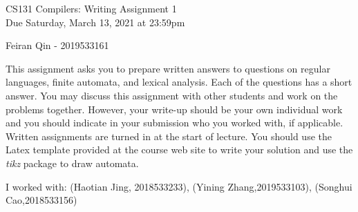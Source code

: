 \documentclass[10pt]{article}
\begin{document}
\begin{center}
\Large CS131 Compilers: Writing Assignment 1\\Due Saturday, March 13, 2021 at 23:59pm
\end{center}

\begin{center}
\LARGE Feiran Qin - 2019533161
\end{center}


This assignment asks you to prepare written answers to questions on
regular languages, finite automata, and lexical analysis.  Each of the
questions has a short answer.  You may discuss this assignment with
other students and work on the problems together.  However, your
write-up should be your own individual work and you should indicate in your submission who you worked
with, if applicable.  Written assignments are turned in at the start of lecture.
You should use the Latex template provided at the course web site to write your solution and use the \emph{tikz} package to draw
automata.

\begin{center}
I worked with: (Haotian Jing, 2018533233), (Yining Zhang,2019533103), (Songhui Cao,2018533156)
\end{center}
\end{document}
